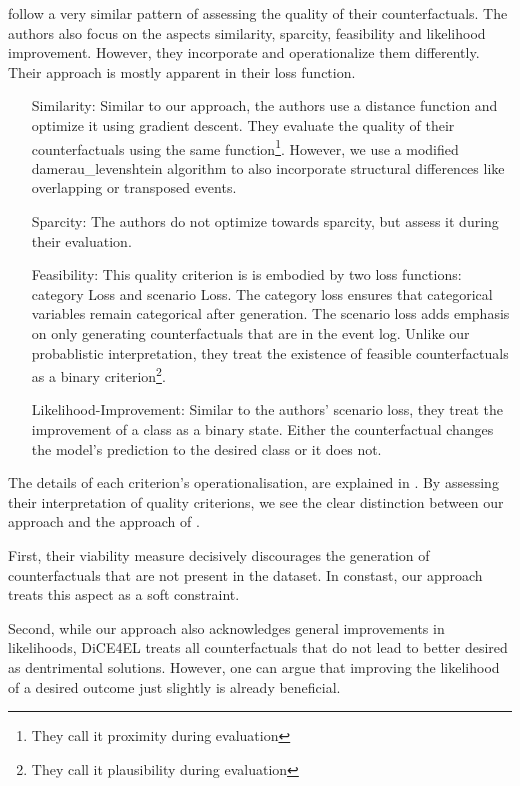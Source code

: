\documentclass[./../../paper.tex]{subfiles}
\begin{document}
\citeauthor{hsieh_DiCE4ELInterpretingProcess_2021} follow a very similar pattern of assessing the quality of their counterfactuals. The authors also focus on the aspects similarity, sparcity, feasibility and likelihood improvement. However, they incorporate and operationalize them differently. Their approach is mostly apparent in their loss function.

\begin{itemize}
    \item[Similarity:] Similar to our approach, the authors use a distance function and optimize it using gradient descent. They evaluate the quality of their counterfactuals using the same function\footnote{They call it proximity during evaluation}. However, we use a modified \gls{damerau_levenshtein} algorithm to also incorporate structural differences like overlapping or transposed events.      
    \item[Sparcity:] The authors do not optimize towards sparcity, but assess it during their evaluation. 
    \item[Feasibility:] This quality criterion is is embodied by two loss functions: category Loss and scenario Loss. The category loss ensures that categorical variables remain categorical after generation. The scenario loss adds emphasis on only generating counterfactuals that are in the event log. Unlike our probablistic interpretation, they treat the existence of feasible counterfactuals as a binary criterion\footnote{They call it plausibility during evaluation}.   
    \item[Likelihood-Improvement:] Similar to the authors' scenario loss, they treat the improvement of a class as a binary state. Either the counterfactual changes the model's prediction to the desired class or it does not.
\end{itemize}

The details of each criterion's operationalisation, are explained in \autocite{hsieh_DiCE4ELInterpretingProcess_2021}. By assessing their interpretation of quality criterions, we see the clear distinction between our approach and the approach of \citeauthor{hsieh_DiCE4ELInterpretingProcess}. 

First, their viability measure decisively discourages the generation of counterfactuals that are not present in the dataset. In constast, our approach treats this aspect as a soft constraint. 

Second, while our approach also acknowledges general improvements in likelihoods, DiCE4EL treats all counterfactuals that do not lead to better desired as dentrimental solutions. However, one can argue that improving the likelihood of a desired outcome just slightly is already beneficial.
\end{document}
